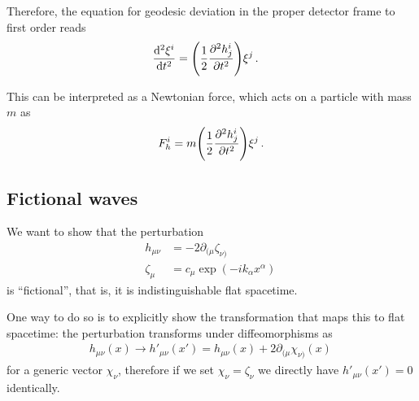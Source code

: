 \documentclass[main.tex]{subfiles}
\begin{document}
Therefore, the equation for geodesic deviation in the proper detector frame to first order reads 
%
\begin{align}
\dv[2]{\xi^{i}}{t} &= \qty( \frac{1}{2} \pdv[2]{h^{i}_{j}}{t} ) \xi^{j}
\,.
\end{align}

This can be interpreted as a Newtonian force, which acts on a particle with mass \(m\) as
%
\begin{align}
F_h^{i} = m \qty( \frac{1}{2} \pdv[2]{h^{i}_{j}}{t} ) \xi^{j}
\,.
\end{align}

\subsection{Fictional waves}

We want to show that the perturbation 
%
\begin{align}
h_{\mu \nu } &= - 2 \partial_{(\mu } \zeta_{\nu )}  \\
\zeta_{\mu } &= c_\mu \exp( - i k_\alpha x^{\alpha })
\,
\end{align}
%
is ``fictional'', that is, it is indistinguishable flat spacetime.

One way to do so is to explicitly show the transformation that maps this to flat spacetime: the perturbation transforms under diffeomorphisms as 
%
\begin{align}
h_{\mu \nu } (x) \to h'_{\mu \nu } (x') = h_{\mu \nu } (x) + 2 \partial_{(\mu } \chi_{\nu )} (x)
\,
\end{align}
%
for a generic vector \(\chi_{\nu }\), therefore if we set \(\chi _\nu = \zeta _\nu \) we directly have \(h'_{\mu \nu } (x') = 0\) identically.
\end{document}
